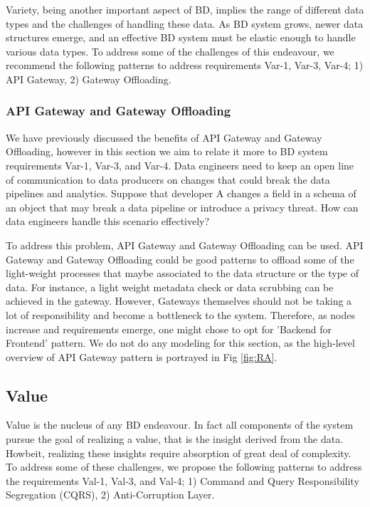 \documentclass[a4paper,11pt,article,oneside]{memoir}
\begin{document}
Variety, being another important aspect of BD, implies the range of different data types and the challenges of handling these data. As BD system grows, newer data structures emerge, and an effective BD system must be elastic enough to handle various data types. To address some of the challenges of this endeavour, we recommend the following patterns to address requirements Var-1, Var-3, Var-4; 1) API Gateway, 2) Gateway Offloading.

\subsubsection{API Gateway and Gateway Offloading}

We have previously discussed the benefits of API Gateway and Gateway Offloading, however in this section we aim to relate it more to BD system requirements Var-1, Var-3, and Var-4. Data engineers need to keep an open line of communication to data producers on changes that could break the data pipelines and analytics. Suppose that developer A changes a field in a schema of an object that may break a data pipeline or introduce a privacy threat. How can data engineers handle this scenario effectively? 

To address this problem, API Gateway and Gateway Offloading can be used. API Gateway and Gateway Offloading could be good patterns to offload some of the light-weight processes that maybe associated to the data structure or the type of data. For instance, a light weight metadata check or data scrubbing can be achieved in the gateway. However, Gateways themselves should not be taking a lot of responsibility and become a bottleneck to the system. Therefore, as nodes increase and requirements emerge, one might chose to opt for 'Backend for Frontend' pattern. We do not do any modeling for this section, as the high-level overview of API Gateway pattern is portrayed in Fig \ref{fig:RA}.

\subsection{Value}

Value is the nucleus of any BD endeavour. In fact all components of the system pursue the goal of realizing a value, that is the insight derived from the data. Howbeit, realizing these insights require absorption of great deal of complexity. To address some of these challenges, we propose the following patterns to address the requirements Val-1, Val-3, and Val-4; 1) Command and Query Responsibility Segregation (CQRS), 2) Anti-Corruption Layer.
\end{document}
